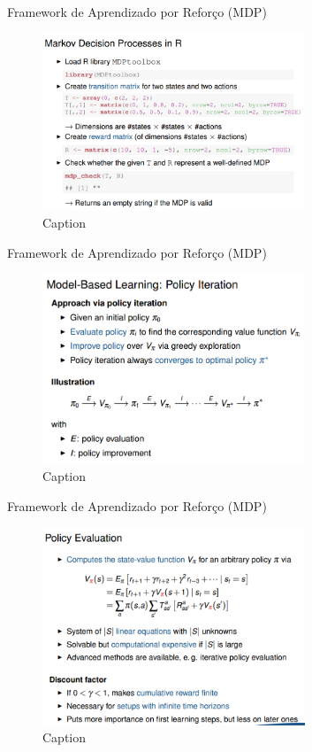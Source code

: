 \begin{frame}{Framework de Aprendizado por Reforço (MDP)}
    \begin{figure}
        \centering
        \includegraphics[width=0.7\textwidth]{img/codeMdp.png}
        \caption{Caption}
        \label{fig:my_label}
    \end{figure}
\end{frame}

\begin{frame}{Framework de Aprendizado por Reforço (MDP)}
    \begin{figure}
        \centering
        \includegraphics[width=0.7\textwidth]{img/policyIteration.png}
        \caption{Caption}
        \label{fig:my_label}
    \end{figure}
\end{frame}

\begin{frame}{Framework de Aprendizado por Reforço (MDP)}
    \begin{figure}
        \centering
        \includegraphics[width=0.7\textwidth]{img/policyEvaluation.png}
        \caption{Caption}
        \label{fig:my_label}
    \end{figure}
\end{frame}

